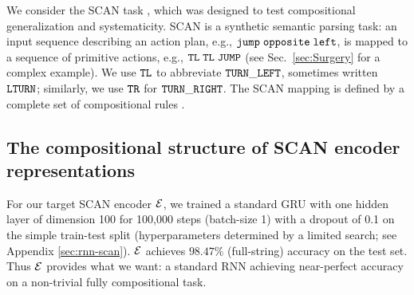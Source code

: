 We consider the SCAN task \citep{lake2018generalization}, which was designed to test compositional generalization and systematicity. SCAN is a synthetic semantic parsing
task: an input sequence describing an action plan, e.g., \textcolor{violet}{${\mathtt{jump \hspace{1mm} opposite \hspace{1mm} left}}$}, is mapped to a sequence of primitive actions, e.g., \textcolor{violet}{${\mathtt{TL \hspace{1mm} TL \hspace{1mm} JUMP}}$} (see Sec.~\ref{sec:Surgery} for a complex example). We use \textcolor{violet}{${\mathtt{TL}}$} to abbreviate \textcolor{violet}{${\mathtt{TURN\_LEFT}}$}, sometimes written \textcolor{violet}{${\mathtt{LTURN}}$}; similarly, we use \textcolor{violet}{${\mathtt{TR}}$} for \textcolor{violet}{${\mathtt{TURN\_RIGHT}}$}. The SCAN mapping is defined by a complete set of compositional rules \citep[Supplementary Fig. 7]{lake2018generalization}. 

\begin{table}[ht]
\caption{\label{tab:scan-accuracy}Mean substitution accuracy for learned (bold) and hand-defined role schemes on SCAN across three random initializations. Standard deviation was below 1\% for all schemes except for snapped. Substitution accuracy is measured by feeding \RLN's approximation to the target decoder. (Sec.~\ref{sec:SCANnetReps})}
\end{table}

\subsection{The compositional structure of SCAN encoder representations} \label{sec:SCANnetReps}

For our target SCAN encoder ${\mathcal{E}}$, we trained a standard GRU with one hidden layer of dimension 100 for 100,000 steps (batch-size 1) with a dropout of 0.1 on the simple train-test split (hyperparameters determined by a limited search; see Appendix \ref{sec:rnn-scan}).
${\mathcal{E}}$ achieves $98.47\%$ (full-string) accuracy on the test set. Thus ${\mathcal{E}}$ provides what we want: a standard RNN achieving near-perfect accuracy on a non-trivial fully compositional task.

